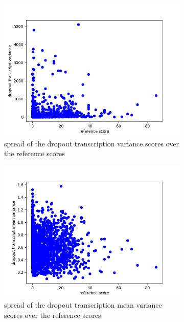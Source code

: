 \begin{figure}
    \begin{subfigure}{0.4\linewidth}
        \includegraphics[width=\textwidth]{Latex/sections/images/seamlessdropouttranscriptvar.png}
        \caption{spread of the dropout transcription variance scores over the reference scores}
    \end{subfigure}
    \begin{subfigure}{0.4\linewidth}
        \includegraphics[width=\textwidth]{Latex/sections/images/seamlessdropouttranscriptmeanvar.png}
        \caption{spread of the dropout transcription mean variance scores over the reference scores}
    \end{subfigure}
    \begin{subfigure}{0.4\linewidth}

\end{subfigure}
\end{figure}
